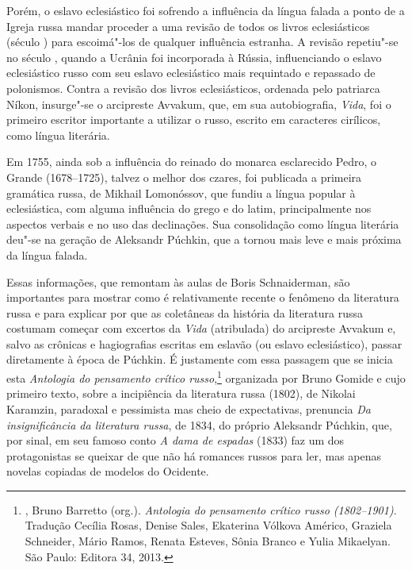 Porém, o eslavo eclesiástico foi sofrendo a influência da língua falada
a ponto de a Igreja russa mandar proceder a uma revisão de todos os
livros eclesiásticos (século ) para escoimá"-los de qualquer
influência estranha. A revisão repetiu"-se no século , quando a
Ucrânia foi incorporada à Rússia, influenciando o eslavo eclesiástico
russo com seu eslavo eclesiástico mais requintado e repassado de
polonismos. Contra a revisão dos livros eclesiásticos, ordenada pelo
patriarca Níkon, insurge"-se o arcipreste Avvakum, que, em sua
autobiografia, \emph{Vida}, foi o primeiro escritor importante a
utilizar o russo, escrito em caracteres cirílicos, como língua literária.

Em 1755, ainda sob a influência do reinado do monarca esclarecido Pedro, o
Grande (1678--1725), talvez o melhor dos czares, foi publicada a primeira
gramática russa, de Mikhail Lomonóssov, que fundiu a língua popular à
eclesiástica, com alguma influência do grego e do latim,
 principalmente nos aspectos verbais e no uso das declinações. Sua
consolidação como língua literária deu"-se na geração de Aleksandr Púchkin, que a tornou mais leve e mais próxima da língua falada.

Essas informações, que remontam às aulas de Boris Schnaiderman, são
importantes para mostrar como é relativamente recente o fenômeno da
literatura russa e para explicar por que as coletâneas da história
da literatura russa costumam começar com excertos da \emph{Vida} (atribulada) do arcipreste Avvakum e, salvo as crônicas e hagiografias
escritas em eslavão (ou eslavo eclesiástico), passar diretamente à época de Púchkin. É
justamente com essa passagem que se inicia esta \emph{Antologia do
pensamento crítico russo},\footnote{, Bruno Barretto
 (org.). \emph{Antologia do pensamento crítico russo (1802--1901)}.
 Tradução Cecília Rosas, Denise Sales, Ekaterina Vólkova Américo,
 Graziela Schneider, Mário Ramos, Renata Esteves, Sônia Branco e Yulia
 Mikaelyan. São Paulo: Editora 34, 2013.} organizada por Bruno Gomide e cujo
primeiro texto, sobre a incipiência da literatura russa (1802), de
Nikolai Karamzin, paradoxal e pessimista mas cheio de expectativas,
prenuncia \emph{Da insignificância da literatura russa}, de 1834, do
próprio Aleksandr Púchkin, que, por sinal, em seu famoso conto \emph{A dama
de espadas} (1833) faz um dos protagonistas se queixar de que não há romances
russos para ler, mas apenas novelas copiadas de modelos do Ocidente.

